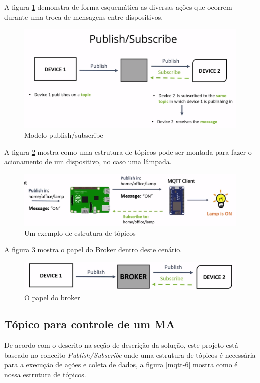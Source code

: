 A figura \ref{mqtt-3} demonstra de forma esquemática as diversas ações que ocorrem durante uma troca de mensagens entre dispositivos.

\begin{figure}[H]
\caption{\label{mqtt-3} Modelo publish/subscribe}
\includegraphics[scale=0.25]{img/mqtt-3.png}
\end{figure}

A figura \ref{mqtt-4} mostra como uma estrutura de tópicos pode ser montada para fazer o acionamento de um dispositivo, no caso uma lâmpada.

\begin{figure}[H]
\caption{\label{mqtt-4} Um exemplo de estrutura de tópicos}
\includegraphics[scale=0.3]{img/mqtt-5.png}
\end{figure}

A figura \ref{mqtt-5} mostra o papel do Broker dentro deste cenário.

\begin{figure}[H]
\caption{\label{mqtt-5} O papel do broker}
\includegraphics[scale=0.25]{img/mqtt-4.png}
\end{figure}

\subsection{Tópico para controle de um MA}
De acordo com o descrito na seção de descrição da solução, este projeto está baseado no conceito \textit{Publish/Subscribe} onde uma estrutura de tópicos é necessária para a execução de ações e coleta de dados, a figura \ref{mqtt-6} mostra como é nossa estrutura de tópicos.

